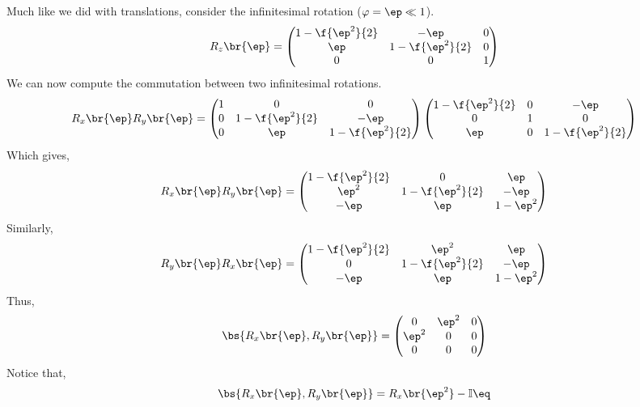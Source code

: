 \documentclass{article}
\begin{document}
Much like we did with translations, consider the infinitesimal rotation ($\varphi = \ep \ll 1$).
\[ R_{z}\br{\ep} = \begin{pmatrix}
    1 - \f{\ep^2}{2} & - \ep & 0 \\
    \ep & 1 - \f{\ep^2}{2} & 0 \\
    0 & 0 & 1 \\
\end{pmatrix} \]
We can now compute the commutation between two infinitesimal rotations.
\[ R_{x}\br{\ep}R_{y}\br{\ep} = \begin{pmatrix}
    1 & 0 & 0 \\
    0 & 1 - \f{\ep^2}{2} & - \ep \\
    0 & \ep & 1 - \f{\ep^2}{2} \\
\end{pmatrix}\begin{pmatrix}
    1 - \f{\ep^2}{2} & 0 & - \ep \\
    0 & 1 & 0 \\
    \ep & 0 & 1 - \f{\ep^2}{2} \\
\end{pmatrix} \]
Which gives,
\[ R_{x}\br{\ep}R_{y}\br{\ep} = \begin{pmatrix}
    1 - \f{\ep^2}{2} & 0 & \ep \\
    \ep^2 & 1 - \f{\ep^2}{2} & -\ep \\
    -\ep & \ep & 1 - \ep^2 \\
\end{pmatrix} \]
Similarly,
\[ R_{y}\br{\ep}R_{x}\br{\ep} = \begin{pmatrix}
    1 - \f{\ep^2}{2} & \ep^2 & \ep \\
    0 & 1 - \f{\ep^2}{2} & -\ep \\
    -\ep & \ep & 1 - \ep^2 \\
\end{pmatrix} \]
Thus,
\[ \bs{R_{x}\br{\ep}, R_{y}\br{\ep}} = \begin{pmatrix}
    0 & \ep^2 & 0 \\
    \ep^2 & 0 & 0 \\
    0 & 0 & 0 \\
\end{pmatrix} \]
Notice that,
\[ \bs{R_{x}\br{\ep}, R_{y}\br{\ep}} = R_{x}\br{\ep^2} - \mathbb{I} \eq \label{eq:rotation_infinitesimal} \]
\end{document}
